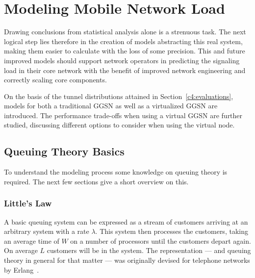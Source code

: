 \section{Modeling Mobile Network Load}
\label{c4:modeling}

Drawing conclusions from statistical analysis alone is a strenuous task. The next logical step lies therefore in the creation of models abstracting this real system, making them easier to calculate with the loss of some precision. This and future improved models should support network operators in predicting the signaling load in their core network with the benefit of improved network engineering and correctly scaling core components.

On the basis of the tunnel distributions attained in Section~\ref{c4:evaluations}, models for both a traditional \gls{GGSN} as well as a virtualized \gls{GGSN} are introduced. The performance trade-offs when using a virtual \gls{GGSN} are further studied, discussing different options to consider when using the virtual node.




\subsection{Queuing Theory Basics}

To understand the modeling process some knowledge on queuing theory is required. The next few sections give a short overview on this.

\subsubsection{Little's Law}

A basic queuing system can be expressed as a stream of customers arriving at an arbitrary system with a rate $\lambda$. This system then processes the customers, taking an average time of $W$ on a number of processors until the customers depart again. On average $L$ customers will be in the system. The representation --- and queuing theory in general for that matter --- was originally devised for telephone networks by Erlang~\cite{erlang1917solution}.

